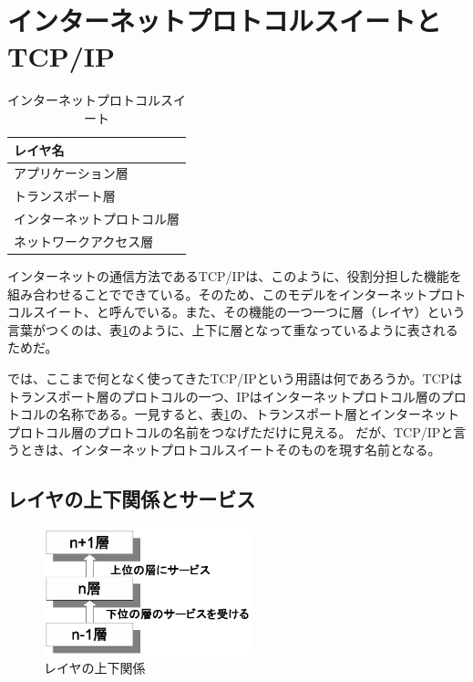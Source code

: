 \section{インターネットプロトコルスイートとTCP/IP}

\begin{table}[hbtp] 
\begin{center} \label{internetprotocolsuite}
	\begin{tabular}{l}  \toprule 
		レイヤ名 \\ \midrule
		アプリケーション層 \\
		トランスポート層 \\
		インターネットプロトコル層 \\
		ネットワークアクセス層 \\ \bottomrule
	\end{tabular} \caption{インターネットプロトコルスイート}
\end{center}
\end{table}

インターネットの通信方法であるTCP/IPは、このように、役割分担した機能を組み合わせることでできている。そのため、このモデルをインターネットプロトコルスイート、と呼んでいる。また、その機能の一つ一つに層（レイヤ）という言葉がつくのは、表\ref{internetprotocolsuite}のように、上下に層となって重なっているように表されるためだ。


では、ここまで何となく使ってきたTCP/IPという用語は何であろうか。TCPはトランスポート層のプロトコルの一つ、IPはインターネットプロトコル層のプロトコルの名称である。一見すると、表\ref{internetprotocolsuite}の、トランスポート層とインターネットプロトコル層のプロトコルの名前をつなげただけに見える。
だが、TCP/IPと言うときは、インターネットプロトコルスイートそのものを現す名前となる。

\subsection{レイヤの上下関係とサービス}

\begin{figure}
	\includegraphics[width=6cm, clip]{draw/service.eps}
	\caption{レイヤの上下関係}
	\label{fig:service}
\end{figure}

